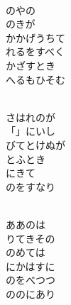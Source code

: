 \documentclass[10pt,b5j]{tarticle} %
\begin{document}
\begin{enumerate}
\begin{minipage}[c]{\blocksize}
    \end{minipage}
    \begin{minipage}[c]{\blocksize}
        
        \vspace{\linespace}
        \item~\\
        のやの\\
        のきが\\
        かかげうちて\\
        れるをすべく\\
        かざすとき\\
        へるもひそむ
        
    \end{minipage}
    \begin{minipage}[c]{\blocksize}
        
        \vspace{\linespace}
        \item~\\
        さはれのが\\
        「」にいし\\
        びてとけぬが\\
        とふとき\\
        にきて\\
        のをすなり
        
    \end{minipage}
    \begin{minipage}[c]{\blocksize}
        
        \vspace{\linespace}
        \item~\\
        ああのは\\
        りてきその\\
        のめては\\
        にかはすに\\
        のをべつつ\\
        ののにあり
    
    \end{minipage}
\end{enumerate} %
\end{document}
